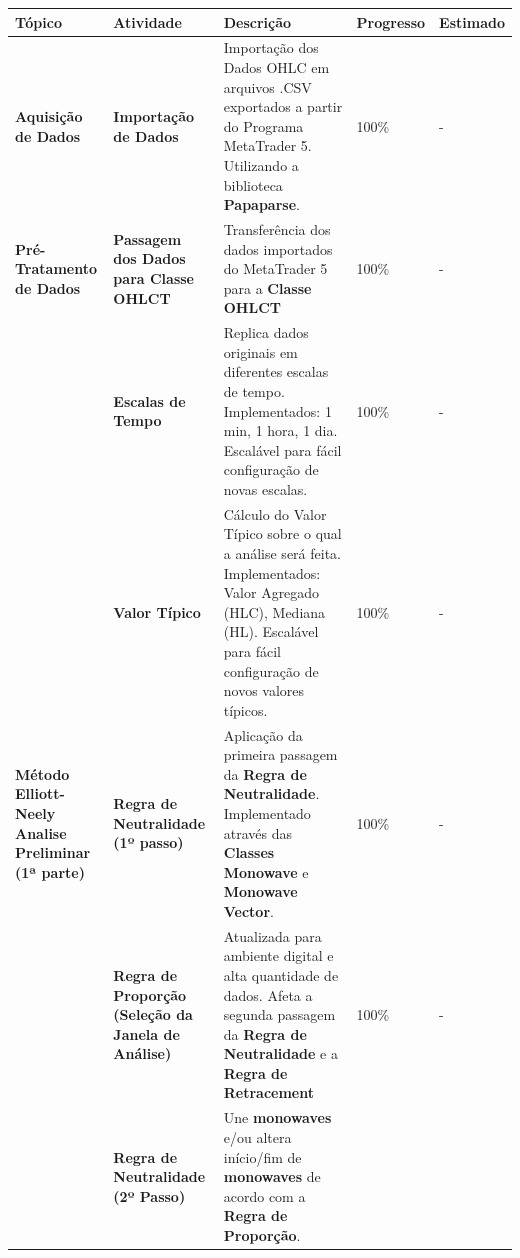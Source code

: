\documentclass[12pt]{article}
\begin{document}
\begingroup
\renewcommand*{\arraystretch}{1.5}
\begin{table}[H]
\centering
\scriptsize
\begin{tabular}{|L{3cm}|L{2cm}|L{5cm}|R{1.4cm}|R{1.4cm}|}
	\hline
	\textbf{Tópico} & \textbf{Atividade} & \textbf{Descrição} & \textbf{Progresso} & \textbf{Estimado} \\
	\hline
	\hline
	\textbf{Aquisição de Dados}
		& \textbf{Importação de Dados}
		& 	Importação dos Dados OHLC em arquivos .CSV exportados a partir do Programa MetaTrader 5. \newline
			Utilizando a biblioteca \textbf{Papaparse}.
		& 100\%
		& - \\
	\hline
	\textbf{Pré-Tratamento de Dados}
		& \textbf{Passagem dos Dados para Classe OHLCT}
		& Transferência dos dados importados do MetaTrader 5 para a \textbf{Classe OHLCT}
		& 100\%
		& - \\
		& \textbf{Escalas de Tempo}
		&	Replica dados originais em diferentes escalas de tempo. \newline
			Implementados: 1 min, 1 hora, 1 dia. \newline
			Escalável para fácil configuração de novas escalas.
		& 100\%
		& - \\
		& \textbf{Valor Típico}
		&	Cálculo do Valor Típico sobre o qual a análise será feita. \newline
			Implementados: Valor Agregado (HLC), Mediana (HL). \newline
			Escalável para fácil configuração de novos valores típicos.
		& 100\%
		& - \\
	\hline
	\textbf{Método Elliott-Neely \newline Analise Preliminar \newline (1ª parte)}
		& \textbf{Regra de Neutralidade (1º passo)}
		&	Aplicação da primeira passagem da \textbf{Regra de Neutralidade}. \newline
			Implementado através das \textbf{Classes Monowave} e \textbf{Monowave Vector}.
		& 100\%
		& - \\
		& \textbf{Regra de Proporção \newline (Seleção da Janela de Análise)}
		&	Atualizada para ambiente digital e alta quantidade de dados. \newline
			Afeta a segunda passagem da \textbf{Regra de Neutralidade} e a \textbf{Regra de Retracement}
		& 100\%
		& - \\
		& \textbf{Regra de Neutralidade (2º Passo)}
		& Une \textbf{monowaves} e/ou altera início/fim de \textbf{monowaves} de acordo com a \textbf{Regra de Proporção}.

\end{tabular}
\end{table}
\end{document}
